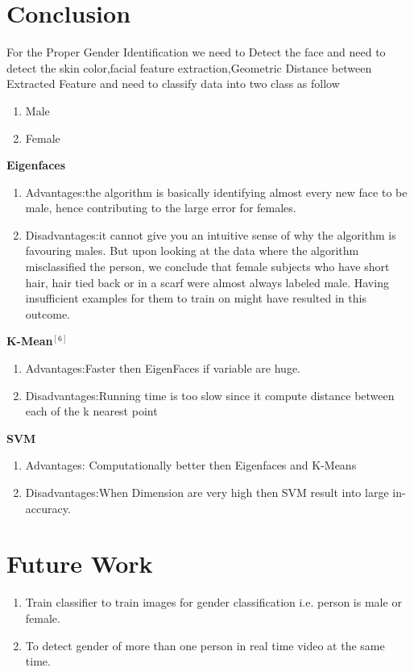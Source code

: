 \documentclass[journal]{IEEEtran}
\begin{document}
	\section{\textbf{Conclusion}}
	For the Proper Gender Identification we need to Detect the face and need to detect the skin color,facial feature extraction,Geometric Distance between Extracted Feature and need to classify data into two class as follow
	\begin{enumerate}
		\item Male
		\item Female
	\end{enumerate} 
	\textbf{Eigenfaces}
	\begin{enumerate}
		\item Advantages:the algorithm is basically identifying almost every new face to be male, hence contributing to the large error for females.
		\item Disadvantages:it cannot give you an intuitive sense of why the algorithm is favouring males. But upon looking at the data where the algorithm misclassified the person, we conclude that female subjects who have short hair, hair tied back or in a scarf were almost always labeled male. Having insufficient examples for them to train on might have resulted in this outcome.
	\end{enumerate}
	\textbf{K-Mean$^{[6]}$}
	\begin{enumerate}
		\item Advantages:Faster then EigenFaces if variable are huge.
		\item Disadvantages:Running time is too slow since it compute distance between each of the k nearest point
	\end{enumerate}		
	\textbf{SVM}
	\begin{enumerate}
		\item Advantages: Computationally better then Eigenfaces and K-Means 
		\item Disadvantages:When Dimension are very high  then SVM result into large in-accuracy.
	\end{enumerate}
	
	
	
	
	\section{\textbf{Future Work}}
	\begin{enumerate}
		\item Train classifier to train images for gender classification i.e. person is male or female.
		\item To detect gender of more than one person in real time video at the same time.
		
		
	\end{enumerate}
	
\end{document}
